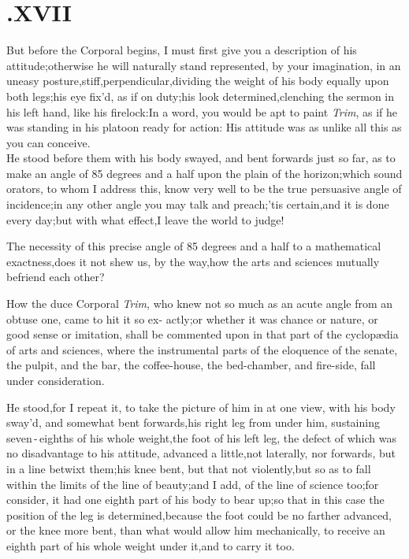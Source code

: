 \documentclass{article}
\begin{document}
\section{.\enspace  XVII}

\quad\tsh But before the Corporal
begins, I must first give you a description of his
attitude;\tsh otherwise he will naturally stand
represented, by your imagination, in an uneasy
posture,\tsk stiff,\tsk perpendi\-cular,\tsk dividing the
weight of his body equally upon both legs;\tsh his eye fix’d,
as if on duty;\tsk his look determined,\tsk\break clenching the
sermon in his left hand, like his firelock:\tsk In a word,
you would be apt to paint \textit{Trim}, as if he was standing in his
platoon ready for action:\tsh\break
His attitude was as unlike all this as you\break
can conceive.\\
\newpage
He stood before them with his body swayed, and bent forwards
just so far, as to make an angle of 85 degrees and a half upon the
plain of the horizon;\tsh\break which sound orators, to whom I address
this, know very well to be the true persuasive angle of
incidence;\tsk in any other angle you may talk and
preach;\tsk ’tis certain,\tsk and it is done every
day;\tsk\break but with what effect,\tsk I leave the world to
judge!

The necessity of this precise angle of 85 degrees and a half to
a mathematical exactness,\tsh does it not shew us, by the
way,\tsk how the arts and sciences mutually befriend each other?

How the duce Corporal \textit{Trim}, who\break
knew not so much as an acute angle\break
from an obtuse one, came to hit it so ex-
actly;\tsh or whether it was chance or nature, or good
sense or imitation, \etc\break shall be commented upon in that part of
the cyclopædia of arts and sciences, where the instrumental
parts of the eloquence of the senate, the pulpit, and the bar, the
coffee-house, the bed-chamber, and fire-side, fall under
consideration.

He stood,\tsh for I repeat it, to take the picture of
him in at one view, with his body sway’d, and somewhat bent
forwards,\tsk his right leg from under him, sustaining
seven\,-\,eighths of his whole\break
weight,\tsk the foot of his
left leg, the defect of which was no disadvantage to his attitude,
advanced a little,\tsk not laterally, nor forwards, but in a line
betwixt them;\tsk his knee bent, but that not
violently,\tsk but so as to fall within the limits of the line of
beauty;\tsk and I add,
of the line of science too;\tsk for
consider, it had one eighth part of his body to bear up;\tsk so
that in this case the position of the leg is
determined,\tsk because the foot could be no farther advanced, or
the knee more bent, than what would allow him mechanically,
to receive an eighth part of his whole weight under\break
it,\tsk and to carry it too.
\end{document}
